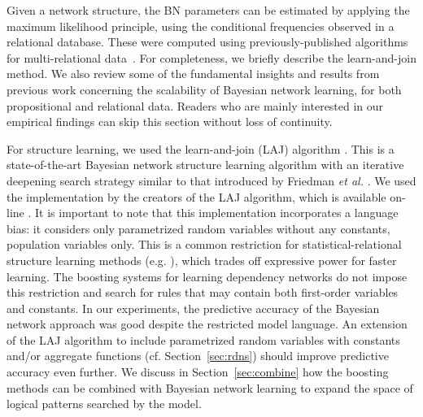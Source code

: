 \documentclass[runningheads,a4paper]{llncs}
\begin{document}
Given a network structure, the BN parameters can be estimated by applying the maximum likelihood principle, using the conditional frequencies observed in a relational database. 
These were computed using previously-published algorithms for multi-relational data~\cite{Schulte2014}. For completeness, we briefly describe the learn-and-join method. We also review some of the fundamental insights and results from previous work concerning the scalability of Bayesian network learning, for both propositional and relational data. Readers who are mainly interested in our empirical findings can skip this section without loss of continuity.

For structure learning, we used the learn-and-join (LAJ) algorithm \cite{Khosravi2010}. This is a state-of-the-art Bayesian network structure learning algorithm with an iterative deepening search strategy similar to that introduced by Friedman {\em et al.} \cite{Friedman99prm}. We used the implementation by the creators of the LAJ algorithm, which is available on-line \cite{bib:jbnsite}. It is important to note that this implementation incorporates a language bias: it considers only parametrized random variables without any constants, population variables only. This is a common restriction for statistical-relational structure learning methods (e.g. \cite{Friedman99prm,Domingos2009}), which trades off expressive power for faster learning. 
The boosting systems for learning dependency networks do not impose this restriction and search for rules that may contain both first-order variables and constants. In our experiments, the predictive accuracy of the Bayesian network approach was good despite the restricted model language. An extension of the LAJ algorithm to include parametrized random variables with constants and/or aggregate functions (cf. Section~\ref{sec:rdns})  should improve predictive accuracy even further. We discuss in Section~\ref{sec:combine} how the boosting methods can be combined with Bayesian network learning to expand the space of logical patterns searched by the model.
\end{document}
